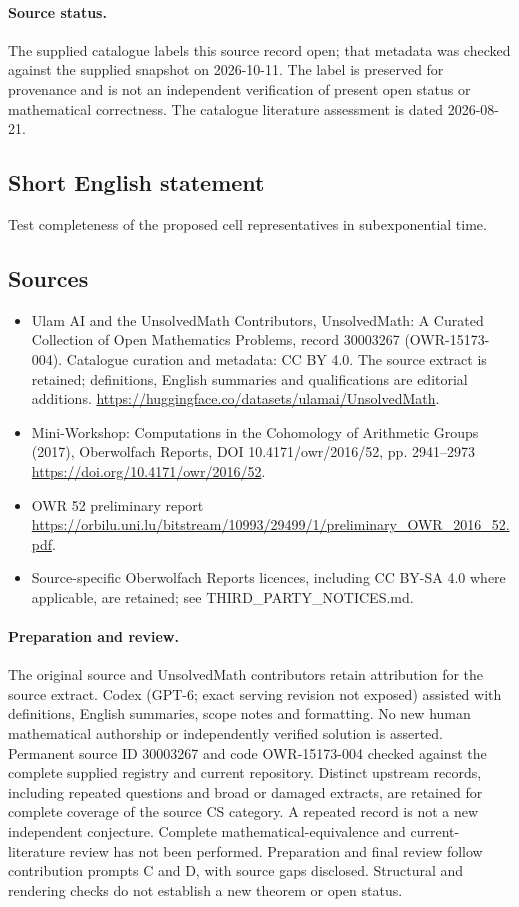\documentclass[11pt]{article}
\begin{document}
\paragraph{Source status.}
The supplied catalogue labels this source record open; that metadata was checked against the supplied snapshot on 2026-10-11. The label is preserved for provenance and is not an independent verification of present open status or mathematical correctness. The catalogue literature assessment is dated 2026-08-21.
\subsection{Short English statement}
Test completeness of the proposed cell representatives in subexponential time.
\subsection{Sources}
\begin{itemize}
\item[S1] Ulam AI and the UnsolvedMath Contributors, UnsolvedMath: A Curated Collection of Open Mathematics Problems, record 30003267 (OWR-15173-004). Catalogue curation and metadata: CC BY 4.0. The source extract is retained; definitions, English summaries and qualifications are editorial additions.
\url{https://huggingface.co/datasets/ulamai/UnsolvedMath}.
\item[S2] Mini-Workshop: Computations in the Cohomology of Arithmetic Groups (2017), Oberwolfach Reports, DOI 10.4171/owr/2016/52, pp. 2941--2973
\url{https://doi.org/10.4171/owr/2016/52}.
\item[S3] OWR 52 preliminary report
\url{https://orbilu.uni.lu/bitstream/10993/29499/1/preliminary_OWR_2016_52.pdf}.
\item Source-specific Oberwolfach Reports licences, including CC BY-SA 4.0 where applicable, are retained; see THIRD\_PARTY\_NOTICES.md.
\end{itemize}
\paragraph{Preparation and review.}
The original source and UnsolvedMath contributors retain attribution for the source extract. Codex (GPT-6; exact serving revision not exposed) assisted with definitions, English summaries, scope notes and formatting. No new human mathematical authorship or independently verified solution is asserted. Permanent source ID 30003267 and code OWR-15173-004 checked against the complete supplied registry and current repository. Distinct upstream records, including repeated questions and broad or damaged extracts, are retained for complete coverage of the source CS category. A repeated record is not a new independent conjecture. Complete mathematical-equivalence and current-literature review has not been performed. Preparation and final review follow contribution prompts C and D, with source gaps disclosed. Structural and rendering checks do not establish a new theorem or open status.
\label{end:30003267}
\end{document}
